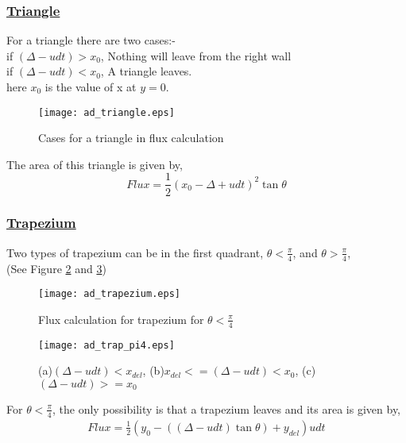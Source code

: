 \subsubsection{\underline{Triangle}}
For a triangle there are two cases:-\\
if $(\Delta-udt)>x_0$, Nothing will leave from the right wall \\
if $(\Delta-udt)<x_0$, A triangle leaves. \\
here $x_0$ is the value of x at $y=0$.
\begin{figure}%
 \centering
 \texttt{[image: ad\_triangle.eps]}
 \caption{Cases for a triangle in flux calculation}
 \label{Fig:triangle_t}
\end{figure}
The area of this triangle is given by,
\begin{equation*}
 \boxed{Flux = \frac{1}{2}(x_0 - \Delta + udt)^2 \tan\theta}
\end{equation*}

\subsubsection{\underline{Trapezium}}
Two types of trapezium can be in the first quadrant, $\theta<\frac{\pi}{4}$, and $\theta>\frac{\pi}{4}$, \\
(See Figure \ref{Fig:trapezium} and \ref{Fig:trapezium_cases}) \\
\begin{figure}%
\centering
 \texttt{[image: ad\_trapezium.eps]}
 \caption{Flux calculation for trapezium for $\theta<\frac{\pi}{4}$}
 \label{Fig:trapezium}
\end{figure}

\begin{figure}%
 \texttt{[image: ad\_trap\_pi4.eps]}
 \caption[Different cases for flux calculation for trapezium]{(a)$(\Delta-udt)<x_{del}$, (b)$x_{del}<=(\Delta-udt)<x_0$, (c)$(\Delta-udt)>=x_0$}
 \label{Fig:trapezium_cases}
\end{figure}

For $\theta<\frac{\pi}{4}$, the only possibility is that a trapezium leaves and its area is given by,
\begin{eqnarray*}
 Flux = \frac{1}{2}( y_0 - ((\Delta - udt) \tan\theta) + y_{del} ) udt \\
\end{eqnarray*}


